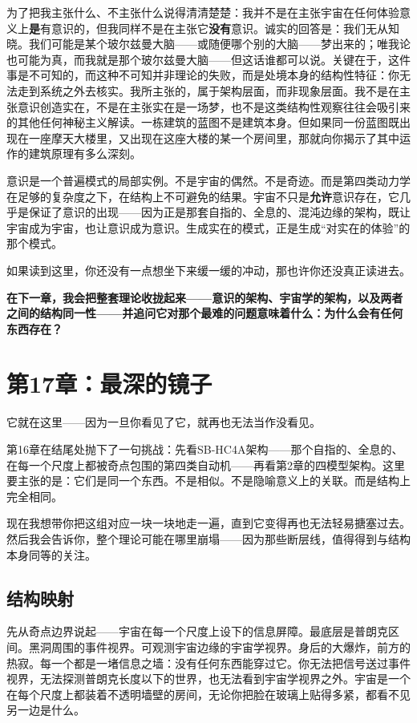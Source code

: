 \documentclass[11pt, twoside, openright]{book}
\begin{document}
为了把我主张什么、不主张什么说得清清楚楚：我并不是在主张宇宙在任何体验意义上\textbf{是}有意识的，但我同样不是在主张它\textbf{没有}意识。诚实的回答是：我们无从知晓。我们可能是某个玻尔兹曼大脑------或随便哪个别的大脑------梦出来的；唯我论也可能为真，而我就是那个玻尔兹曼大脑------但这话谁都可以说。关键在于，这件事是不可知的，而这种不可知并非理论的失败，而是处境本身的结构性特征：你无法走到系统之外去核实。我所主张的，属于架构层面，而非现象层面。我不是在主张意识创造实在，不是在主张实在是一场梦，也不是这类结构性观察往往会吸引来的其他任何神秘主义解读。一栋建筑的蓝图不是建筑本身。但如果同一份蓝图既出现在一座摩天大楼里，又出现在这座大楼的某一个房间里，那就向你揭示了其中运作的建筑原理有多么深刻。

意识是一个普遍模式的局部实例。不是宇宙的偶然。不是奇迹。而是第四类动力学在足够的复杂度之下，在结构上不可避免的结果。宇宙不只是\textbf{允许}意识存在，它几乎是保证了意识的出现------因为正是那套自指的、全息的、混沌边缘的架构，既让宇宙成为宇宙，也让意识成为意识。生成实在的模式，正是生成“对实在的体验”的那个模式。

如果读到这里，你还没有一点想坐下来缓一缓的冲动，那也许你还没真正读进去。


\textbf{在下一章，我会把整套理论收拢起来------意识的架构、宇宙学的架构，以及两者之间的结构同一性------并追问它对那个最难的问题意味着什么：为什么会有任何东西存在？}


\chapter*{第17章：最深的镜子}

它就在这里------因为一旦你看见了它，就再也无法当作没看见。

第16章在结尾处抛下了一句挑战：先看SB-HC4A架构------那个自指的、全息的、在每一个尺度上都被奇点包围的第四类自动机------再看第2章的四模型架构。这里要主张的是：它们是同一个东西。不是相似。不是隐喻意义上的关联。而是结构上完全相同。

现在我想带你把这组对应一块一块地走一遍，直到它变得再也无法轻易搪塞过去。然后我会告诉你，整个理论可能在哪里崩塌------因为那些断层线，值得得到与结构本身同等的关注。

\section*{结构映射}

先从奇点边界说起------宇宙在每一个尺度上设下的信息屏障。最底层是普朗克区间。黑洞周围的事件视界。可观测宇宙边缘的宇宙学视界。身后的大爆炸，前方的热寂。每一个都是一堵信息之墙：没有任何东西能穿过它。你无法把信号送过事件视界，无法探测普朗克长度以下的世界，也无法看到宇宙学视界之外。宇宙是一个在每个尺度上都装着不透明墙壁的房间，无论你把脸在玻璃上贴得多紧，都看不见另一边是什么。
\end{document}
